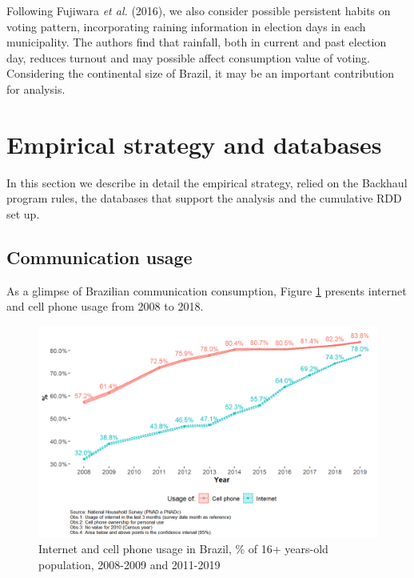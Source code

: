 \documentclass[
  12pt,
]{article}
\begin{document}
Following Fujiwara \emph{et al.} (2016), we also consider possible
persistent habits on voting pattern, incorporating raining information
in election days in each municipality. The authors find that rainfall,
both in current and past election day, reduces turnout and may possible
affect consumption value of voting. Considering the continental size of
Brazil, it may be an important contribution for analysis.

\hypertarget{empirical-strategy-and-databases}{%
\section{Empirical strategy and
databases}\label{empirical-strategy-and-databases}}

In this section we describe in detail the empirical strategy, relied on
the Backhaul program rules, the databases that support the analysis and
the cumulative RDD set up.

\hypertarget{communication-usage}{%
\subsection{Communication usage}\label{communication-usage}}

As a glimpse of Brazilian communication consumption, Figure \ref{fig:0}
presents internet and cell phone usage from 2008 to 2018.

\begin{figure}
\centering
\includegraphics{artigo1_files/figure-latex/internet_usage-1.png}
\caption{Internet and cell phone usage in Brazil, \% of 16+ years-old
population, 2008-2009 and 2011-2019 \label{fig:0}}
\end{figure}
\end{document}
